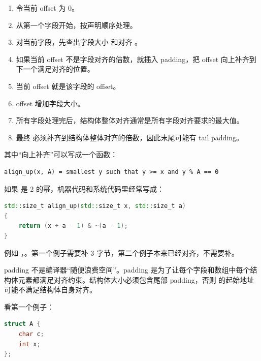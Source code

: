 \begin{enumerate}
  \item 令当前 offset 为 0。
  \item 从第一个字段开始，按声明顺序处理。
  \item 对当前字段，先查出字段大小  和对齐 。
  \item 如果当前 offset 不是字段对齐的倍数，就插入 padding，把 offset 向上补齐到下一个满足对齐的位置。
  \item 当前 offset 就是该字段的 offset。
  \item offset 增加字段大小。
  \item 所有字段处理完后，结构体整体对齐通常是所有字段对齐要求的最大值。
  \item 最终  必须补齐到结构体整体对齐的倍数，因此末尾可能有 tail padding。
\end{enumerate}

其中“向上补齐”可以写成一个函数：

\begin{center}
\begin{minipage}{0.72\linewidth}
\begin{verbatim}
align_up(x, A) = smallest y such that y >= x and y % A == 0
\end{verbatim}
\end{minipage}
\end{center}

如果  是 2 的幂，机器代码和系统代码里经常写成：

\begin{lstlisting}[language=C++]
std::size_t align_up(std::size_t x, std::size_t a)
{
    return (x + a - 1) & ~(a - 1);
}
\end{lstlisting}

例如 ，。第一个例子需要补 3 字节，第二个例子本来已经对齐，不需要补。

\begin{keyidea}
padding 不是编译器“随便浪费空间”。padding 是为了让每个字段和数组中每个结构体元素都满足对齐约束。结构体大小必须包含尾部 padding，否则  的起始地址可能不满足结构体自身对齐。
\end{keyidea}

看第一个例子：

\begin{lstlisting}[language=C++]
struct A {
    char c;
    int x;
};
\end{lstlisting}

